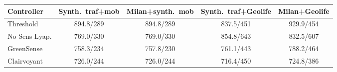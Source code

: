 \begin{tabular}{lcccc}
\toprule
Controller & Synth.\ traf+mob & Milan+synth.\ mob & Synth.\ traf+Geolife & Milan+Geolife \\
\midrule
Threshold & 894.8/289 & 894.8/289 & 837.5/451 & 929.9/454 \\
No-Sens Lyap. & 769.0/330 & 769.0/330 & 854.8/643 & 832.5/607 \\
GreenSense & 758.3/234 & 757.8/230 & 761.1/443 & 788.2/464 \\
Clairvoyant & 726.0/244 & 726.0/244 & 716.4/450 & 724.8/386 \\
\bottomrule
\end{tabular}
